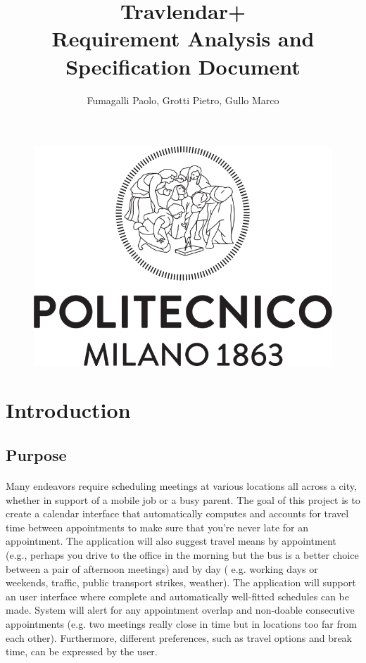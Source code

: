 \documentclass{article}
\title{Travlendar+ \\Requirement Analysis and Specification Document}
\author{Fumagalli Paolo, Grotti Pietro, Gullo Marco}
\begin{document}


\begin{figure}[t]
\includegraphics[width=\linewidth]{Logo_Politecnico_Milano.png}
\label{fig:Logo}
\end{figure}
\maketitle
\newpage
\tableofcontents
\newpage
{}
\section{Introduction}
\subsection{Purpose}
\paragraph{}
Many endeavors require scheduling meetings at various locations all across a city, whether in support of a mobile job or a busy parent. The goal of this project is to create a calendar interface that automatically computes and accounts for travel time between appointments to make sure that you're never late for an appointment. The application will also suggest travel means by appointment (e.g., perhaps you drive to the office in the morning but the bus is a better choice between a pair of afternoon meetings) and by day ( e.g. working days or weekends, traffic, public transport strikes, weather). The application will support an user interface where complete and automatically well-fitted schedules can be made. System will alert for any appointment overlap and non-doable consecutive appointments (e.g. two meetings really close in time but in locations too far from each other). Furthermore, different preferences, such as travel options and break time, can be expressed by the user.
\end{document}
